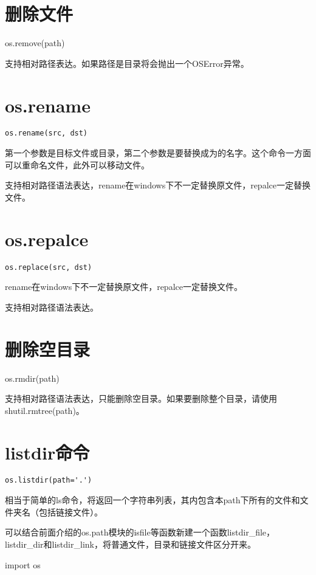 \documentclass[12pt,oneside]{book}
\begin{document}
\begin{common-format}
\section{删除文件}
os.remove(path)

支持相对路径表达。如果路径是目录将会抛出一个OSError异常。

\section{os.rename}
\begin{Verbatim}
os.rename(src, dst)
\end{Verbatim}

第一个参数是目标文件或目录，第二个参数是要替换成为的名字。这个命令一方面可以重命名文件，此外可以移动文件。
 
支持相对路径语法表达，rename在windows下不一定替换原文件，repalce一定替换文件。

\section{os.repalce}
\begin{Verbatim}
os.replace(src, dst)
\end{Verbatim}

rename在windows下不一定替换原文件，repalce一定替换文件。

支持相对路径语法表达。

\section{删除空目录}
os.rmdir(path)

支持相对路径语法表达，只能删除空目录。如果要删除整个目录，请使用shutil.rmtree(path)。

\section{listdir命令}
\begin{Verbatim}
os.listdir(path='.')
\end{Verbatim}

相当于简单的ls命令，将返回一个字符串列表，其内包含本path下所有的文件和文件夹名（包括链接文件）。

可以结合前面介绍的os.path模块的isfile等函数新建一个函数listdir\_{}file，listdir\_{}dir和listdir\_{}link，将普通文件，目录和链接文件区分开来。

\begin{tcbpython}[]
import os


\end{tcbpython}
\end{common-format}
\end{document}
